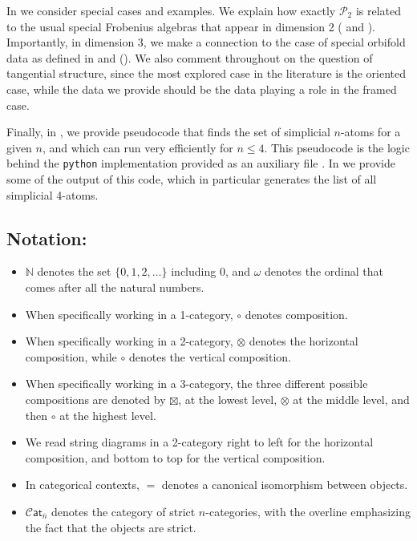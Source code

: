 \documentclass[12pt,a4paper]{article}
\numberwithin{equation}{section}
\newcommand{\cat}[1]{\mathscr{C} \mathsf{at}_{\overline{#1}}}
\begin{document}
In  we consider special cases and examples. We explain how exactly $\mathscr{P}_2$ is related to the usual special Frobenius algebras that appear in dimension 2 ( and ). Importantly, in dimension 3, we make a connection to the case of special orbifold data as defined in \cite{orbifoldnd} and \cite{orbifold3d} (). We also comment throughout on the question of tangential structure, since the most explored case in the literature is the oriented case, while the data we provide should be the data playing a role in the framed case.

Finally, in , we provide pseudocode that finds the set of simplicial $n$-atoms for a given $n$, and which can run very efficiently for $n \leq 4$. This pseudocode is the logic behind the \texttt{python} implementation provided as an auxiliary file \cite{pythoncode}. In  we provide some of the output of this code, which in particular generates the list of all simplicial 4-atoms.

\subsection*{Notation:}\label{ssec:notation}

\begin{itemize}
    \item $\mathbb{N}$ denotes the set $\{0, 1, 2, \dots \}$ including 0, and $\omega$ denotes the ordinal that comes after all the natural numbers.
    \item When specifically working in a 1-category, $\circ$ denotes composition.
    \item When specifically working in a 2-category, $\otimes$ denotes the horizontal composition, while $\circ$ denotes the vertical composition.
    \item When specifically working in a 3-category, the three different possible compositions are denoted by $\boxtimes$, at the lowest level, $\otimes$ at the middle level, and then $\circ$ at the highest level.
    \item We read string diagrams in a 2-category right to left for the horizontal composition, and bottom to top for the vertical composition.
    \item In categorical contexts, $=$ denotes a canonical isomorphism between objects.
    \item $\cat{n}$ denotes the category of strict $n$-categories, with the overline emphasizing the fact that the objects are strict. 
\end{itemize}
\end{document}
